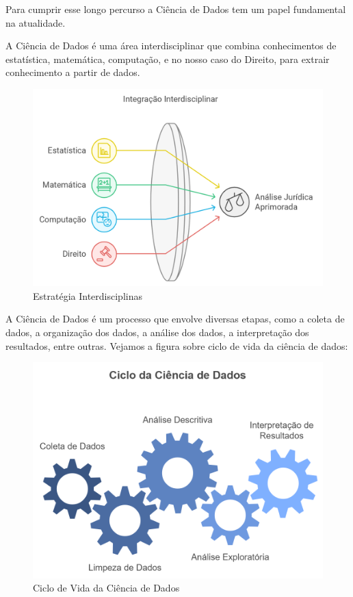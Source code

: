 \documentclass[
  letterpaper,
  DIV=11,
  numbers=noendperiod]{scrreprt}
\begin{document}
Para cumprir esse longo percurso a Ciência de Dados tem um papel
fundamental na atualidade.

A Ciência de Dados é uma área interdisciplinar que combina conhecimentos
de estatística, matemática, computação, e no nosso caso do Direito, para
extrair conhecimento a partir de dados.

\begin{figure}[H]

{\centering \includegraphics[width=0.7\linewidth,height=\textheight,keepaspectratio]{figuras/combina.png}

}

\caption{Estratégia Interdisciplinas}

\end{figure}%

A Ciência de Dados é um processo que envolve diversas etapas, como a
coleta de dados, a organização dos dados, a análise dos dados, a
interpretação dos resultados, entre outras. Vejamos a figura sobre ciclo
de vida da ciência de dados:

\begin{figure}[H]

{\centering \includegraphics[width=0.7\linewidth,height=\textheight,keepaspectratio]{figuras/cicloDS.png}

}

\caption{Ciclo de Vida da Ciência de Dados}

\end{figure}%
\end{document}
